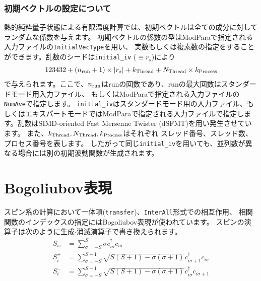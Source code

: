 \subsubsection*{初期ベクトルの設定について}
熱的純粋量子状態による有限温度計算では、初期ベクトルは全ての成分に対してランダムな係数を与えます。
初期ベクトルの係数の型はModParaで指定される入力ファイルの\verb|InitialVecType|を用い、
実数もしくは複素数の指定をすることができます。乱数のシードは\verb|initial_iv| ($\equiv r_s$)により
\begin{align}
123432+(n_{\rm run}+1)\times  |r_s|+k_{\rm Thread}+N_{\rm Thread} \times k_{\rm Process}
\end{align}
で与えられます。ここで、$n_{\rm run}$はrunの回数であり、runの最大回数はスタンダードモード用入力ファイル、
もしくはModParaで指定される入力ファイルの\verb|NumAve|で指定します。
\verb|initial_iv|はスタンダードモード用の入力ファイル、もしくはエキスパートモードではModParaで指定される入力ファイルで指定します。乱数はSIMD-oriented Fast Mersenne Twister (dSFMT)を用い発生させています\cite{Mutsuo2008}。
また、$k_{\rm Thread}, N_{\rm Thread}, k_{\rm Process}$はそれぞれ
スレッド番号、スレッド数、プロセス番号を表します。
したがって同じ\verb|initial_iv|を用いても、並列数が異なる場合には別の初期波動関数が生成されます。


\section{Bogoliubov表現}\label{sec_bogoliubov_rep}

スピン系の計算において一体項(\verb|transfer|)、\verb|InterAll|形式での相互作用、
相関関数のインデックスの指定にはBogoliubov表現が使われています。
スピンの演算子は次のように生成$\cdot$消滅演算子で書き換えられます。
\begin{align}
  S_{i z} &= \sum_{\sigma = -S}^{S} \sigma c_{i \sigma}^\dagger c_{i \sigma}
  \\
  S_{i}^+ &= \sum_{\sigma = -S}^{S-1} 
  \sqrt{S(S+1) - \sigma(\sigma+1)} 
  c_{i \sigma+1}^\dagger c_{i \sigma}
  \\
  S_{i}^- &= \sum_{\sigma = -S}^{S-1} 
  \sqrt{S(S+1) - \sigma(\sigma+1)} 
  c_{i \sigma}^\dagger c_{i \sigma+1}
\end{align}
